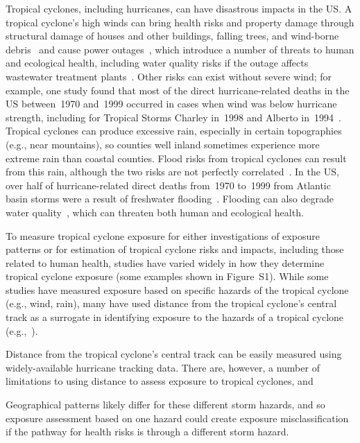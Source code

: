 Tropical cyclones, including hurricanes, can have disastrous impacts in the
\ac{US}. A tropical cyclone's high winds can bring health risks
and property damage through structural damage of houses and other buildings,
falling trees, and wind-borne debris~\parencite{rappaport2000} and cause power
outages~\parencite{liu2005, han2009}, which introduce a number of threats to human
and ecological health, including water quality risks if the outage affects
wastewater treatment plants~\parencite{mallin2006}.  Other risks can exist without
severe wind; for example, one study found that most of the direct
hurricane-related deaths in the \ac{US} between~1970 and~1999 occurred in cases
when wind was below hurricane strength, including for Tropical Storms Charley
in~1998 and Alberto in~1994~\parencite{rappaport2000}.  Tropical cyclones can
produce excessive rain, especially in certain topographies (e.g., near
mountains), so counties well inland sometimes experience more extreme rain than
coastal counties. Flood risks from tropical cyclones can result from this rain,
although the two risks are not perfectly correlated~\parencite{chen2015}. In the
\ac{US}, over half of hurricane-related direct deaths from~1970 to~1999 from
Atlantic basin storms were a result of freshwater flooding~\parencite{rappaport2000}. 
Flooding can also degrade water quality~\parencite{mallin2006}, which can threaten both 
human and ecological health.

To measure tropical cyclone exposure for either investigations of exposure
patterns or for estimation of tropical cyclone risks and impacts, including
those related to human health, studies have varied widely in how they determine
tropical cyclone exposure (some examples shown in Figure~S1). While some
studies have measured exposure based on specific hazards of the tropical
cyclone (e.g., wind, rain), many have used distance from the tropical cyclone's
central track as a surrogate in identifying exposure to the hazards of a
tropical cyclone (e.g.,~\textcite{czajkowski2011, tansel2010, kinney2008,
caillouet2008increase}).  

Distance from the tropical cyclone's central track can be easily measured using
widely-available hurricane tracking data. There are, however, a number of
limitations to using distance to assess exposure to tropical cyclones, and

Geographical patterns likely differ for these different storm hazards, and so
exposure assessment based on one hazard could create exposure misclassification
if the pathway for health risks is through a different storm hazard.  

